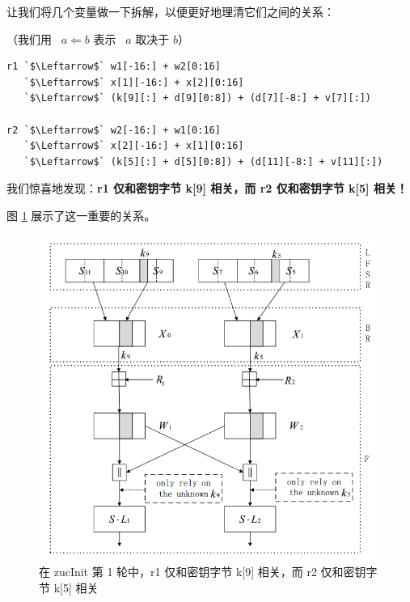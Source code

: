 \newpage

让我们将几个变量做一下拆解，以便更好地理清它们之间的关系：

（我们用\ {\color{blue} $a \Leftarrow b$} 表示\ {\color{blue} $a$ 取决于 $b$}）

\begin{lstlisting}[style=myPython]
r1 `$\Leftarrow$` w1[-16:] + w2[0:16] 
   `$\Leftarrow$` x[1][-16:] + x[2][0:16]
   `$\Leftarrow$` (k[9][:] + d[9][0:8]) + (d[7][-8:] + v[7][:])

r2 `$\Leftarrow$` w2[-16:] + w1[0:16]
   `$\Leftarrow$` x[2][-16:] + x[1][0:16]
   `$\Leftarrow$` (k[5][:] + d[5][0:8]) + (d[11][-8:] + v[11][:])
\end{lstlisting}

我们惊喜地发现：\textbf{{\cnsls r1} 仅和密钥字节 {\cnsls k[9]} 相关，而 {\cnsls r2} 仅和密钥字节 {\cnsls k[5]} 相关！}

图 \ref{fig:zuc_attack} 展示了这一重要的关系。

\begin{figure}[htbp]
    \centering
    \includegraphics[height=.5\textheight]{../images/zuc_attack.png}
    \caption{在 {\cnsls zucInit} 第 1 轮中，{\cnsls r1} 仅和密钥字节 {\cnsls k[9]} 相关，而 {\cnsls r2} 仅和密钥字节 {\cnsls k[5]} 相关 \cite{zuc_attack_tangming}}
    \label{fig:zuc_attack}
\end{figure}

